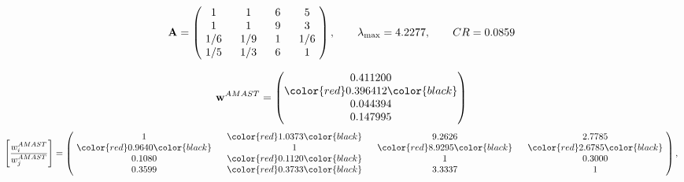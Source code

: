 \begin{example}
\begin{equation*}
\mathbf{A} =
\begin{pmatrix}
$\,\,$ 1 $\,\,$ & $\,\,$1$\,\,$ & $\,\,$6$\,\,$ & $\,\,$5 $\,\,$ \\
$\,\,$ 1 $\,\,$ & $\,\,$ 1 $\,\,$ & $\,\,$9$\,\,$ & $\,\,$3 $\,\,$ \\
$\,\,$ 1/6$\,\,$ & $\,\,$ 1/9$\,\,$ & $\,\,$ 1 $\,\,$ & $\,\,$ 1/6 $\,\,$ \\
$\,\,$ 1/5$\,\,$ & $\,\,$ 1/3$\,\,$ & $\,\,$6$\,\,$ & $\,\,$ 1  $\,\,$ \\
\end{pmatrix},
\qquad
\lambda_{\max} =
4.2277,
\qquad
CR = 0.0859
\end{equation*}

\begin{equation*}
\mathbf{w}^{AMAST} =
\begin{pmatrix}
0.411200\\
\color{red} 0.396412\color{black} \\
0.044394\\
0.147995
\end{pmatrix}\end{equation*}
\begin{equation*}
\left[ \frac{{w}^{AMAST}_i}{{w}^{AMAST}_j} \right] =
\begin{pmatrix}
$\,\,$ 1 $\,\,$ & $\,\,$\color{red} 1.0373\color{black} $\,\,$ & $\,\,$9.2626$\,\,$ & $\,\,$2.7785$\,\,$ \\
$\,\,$\color{red} 0.9640\color{black} $\,\,$ & $\,\,$ 1 $\,\,$ & $\,\,$\color{red} 8.9295\color{black} $\,\,$ & $\,\,$\color{red} 2.6785\color{black}   $\,\,$ \\
$\,\,$0.1080$\,\,$ & $\,\,$\color{red} 0.1120\color{black} $\,\,$ & $\,\,$ 1 $\,\,$ & $\,\,$0.3000 $\,\,$ \\
$\,\,$0.3599$\,\,$ & $\,\,$\color{red} 0.3733\color{black} $\,\,$ & $\,\,$3.3337$\,\,$ & $\,\,$ 1  $\,\,$ \\
\end{pmatrix},
\end{equation*}


\end{example}
